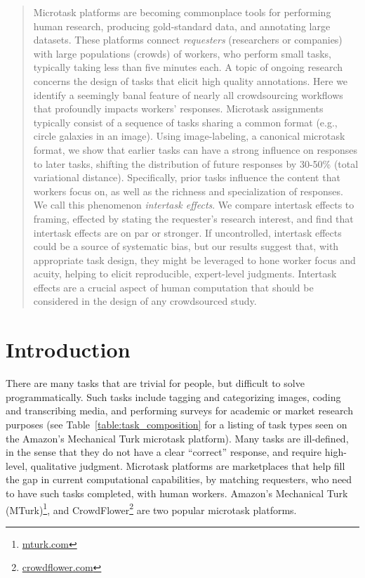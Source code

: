 \documentclass{sigchi}
\begin{document}
\begin{abstract}
Microtask platforms are becoming commonplace tools for performing human
research, producing gold-standard data, and annotating large datasets.
These platforms connect \textit{requesters}
(researchers or companies) with large populations (crowds) of workers, who 
perform small tasks, typically taking less than five minutes each.
A topic of ongoing research concerns the design of tasks that elicit high
quality annotations.
Here we identify a seemingly banal feature of nearly all crowdsourcing 
workflows that profoundly impacts workers' responses.
Microtask assignments typically consist of a sequence 
of tasks sharing a common format (e.g., circle galaxies in an image). 
Using image-labeling, a canonical microtask format, we 
show that earlier tasks can have a strong influence on responses to later 
tasks, shifting the distribution of future responses by 30-50\% 
(total variational distance). 
Specifically, prior tasks influence the content that workers focus on, 
as well as the richness and specialization of responses. 
We call this phenomenon \textit{intertask effects}.
We compare intertask effects to framing, effected by stating the 
requester's research interest, and find that intertask effects are on 
par or stronger.
If uncontrolled, intertask effects could be a source of systematic bias, 
but our results suggest that, with appropriate task design, 
they might be leveraged to hone worker focus and acuity, 
helping to elicit reproducible, expert-level judgments.
Intertask effects are a crucial aspect of human computation that should be
considered in the design of any crowdsourced study.
\end{abstract}



\section{Introduction}
There are many tasks that are trivial for people, but difficult to solve
programmatically.  
Such tasks include tagging and categorizing images,
coding and transcribing media,
and performing surveys for 
academic or market research purposes (see Table~\ref{table:task_composition} for a listing of task types seen on the Amazon's Mechanical Turk 
microtask platform).
Many tasks are ill-defined, in the sense that they do not have
a clear ``correct'' response, and require high-level, qualitative judgment.
Microtask platforms are marketplaces that help fill the gap in current 
computational capabilities, by matching requesters, who need to have such 
tasks completed, with human workers.  Amazon's Mechanical Turk (MTurk)\footnote{\url{mturk.com}}, and 
CrowdFlower\footnote{\url{crowdflower.com}} are two popular microtask 
platforms.  
\end{document}
